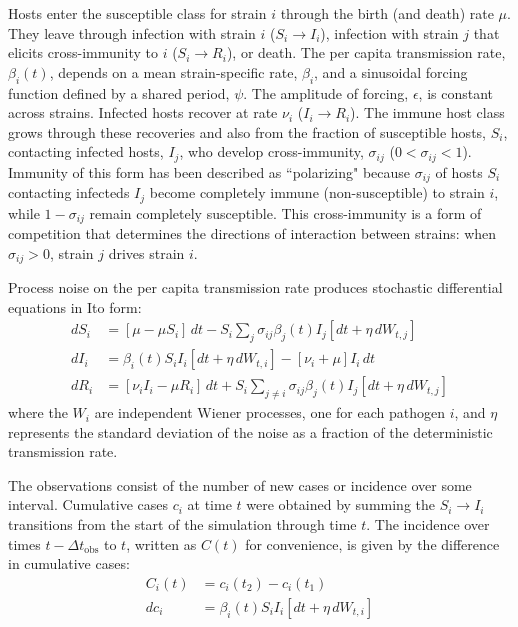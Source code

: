 \documentclass[10pt]{article}
\begin{document}
Hosts enter the susceptible class for strain $i$ through the birth (and death) rate $\mu$. 
They leave through infection with strain $i$ ($S_i \to I_i$), infection with strain $j$ that elicits cross-immunity to $i$ ($S_i \to R_i$), or death.
The per capita transmission rate, $\beta_i(t)$, depends on a mean strain-specific rate, $\beta_i$, and a sinusoidal forcing function defined by a shared period, $\psi$. 
The amplitude of forcing, $\epsilon$, is constant across strains. 
Infected hosts recover at rate $\nu_i$ ($I_i \to R_i$).
The immune host class grows through these recoveries and also from the fraction of susceptible hosts, $S_i$, contacting infected hosts, $I_j$, who develop cross-immunity, $\sigma_{ij}$ ($0<\sigma_{ij}<1$).
Immunity of this form has been described as ``polarizing" because $\sigma_{ij}$ of hosts $S_i$ contacting infecteds $I_j$ become completely immune (non-susceptible) to strain $i$, while $1-\sigma_{ij}$ remain completely susceptible.
This cross-immunity is a form of competition that determines the directions of interaction between strains: when $\sigma_{ij}>0$, strain $j$ drives strain $i$.

Process noise on the per capita transmission rate produces stochastic differential equations in Ito form:
\begin{align}
dS_i &=
	[\mu - \mu S_i] \, dt
	- S_i\sum\limits_{j} \sigma_{ij} \beta_j(t) I_j [dt +\eta \, dW_{t,j}] 
	\\
dI_i &= 
	\beta_i(t) S_i I_i [dt +  \eta \, dW_{t,i}]
	- [\nu_i + \mu] I_i \,  dt \\
dR_i &=
	[\nu_i I_i - \mu R_i] \, dt
	+ S_i\sum\limits_{j \neq i} \sigma_{ij} \beta_j(t) I_j [dt +  \eta \, dW_{t,j}]
\end{align}
where the $W_i$ are independent Wiener processes, one for each pathogen $i$, and $\eta$ represents the standard deviation of the noise as a fraction of the deterministic transmission rate.

The observations consist of the number of new cases or incidence over some interval. 
Cumulative cases $c_i$ at time $t$ were obtained by summing the $S_i \to I_i$ transitions from the start of the simulation through time $t$.
The incidence over times $t-\Delta t_\text{obs}$ to $t$, written as $C(t)$ for convenience, is given by the difference in cumulative cases:
\begin{align}
C_i(t) &= c_i(t_2) - c_i(t_1) \\
dc_i &= \beta_i(t) S_i I_i [dt + \eta \, dW_{t,i}]
\end{align}
\end{document}
